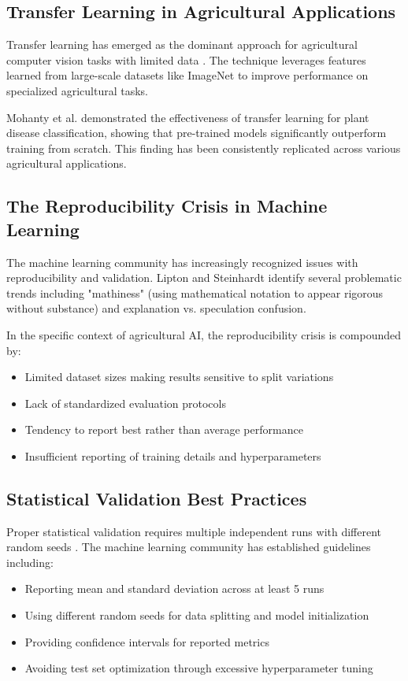 \documentclass[conference]{IEEEtran}
\begin{document}
\subsection{Transfer Learning in Agricultural Applications}

Transfer learning has emerged as the dominant approach for agricultural computer vision tasks with limited data \cite{kamilaris2018deep}. The technique leverages features learned from large-scale datasets like ImageNet to improve performance on specialized agricultural tasks.

Mohanty et al. \cite{mohanty2016using} demonstrated the effectiveness of transfer learning for plant disease classification, showing that pre-trained models significantly outperform training from scratch. This finding has been consistently replicated across various agricultural applications.

\subsection{The Reproducibility Crisis in Machine Learning}

The machine learning community has increasingly recognized issues with reproducibility and validation. Lipton and Steinhardt \cite{lipton2019troubling} identify several problematic trends including "mathiness" (using mathematical notation to appear rigorous without substance) and explanation vs. speculation confusion.

In the specific context of agricultural AI, the reproducibility crisis is compounded by:
\begin{itemize}
    \item Limited dataset sizes making results sensitive to split variations
    \item Lack of standardized evaluation protocols
    \item Tendency to report best rather than average performance
    \item Insufficient reporting of training details and hyperparameters
\end{itemize}

\subsection{Statistical Validation Best Practices}

Proper statistical validation requires multiple independent runs with different random seeds \cite{reimers2017reporting}. The machine learning community has established guidelines including:
\begin{itemize}
    \item Reporting mean and standard deviation across at least 5 runs
    \item Using different random seeds for data splitting and model initialization
    \item Providing confidence intervals for reported metrics
    \item Avoiding test set optimization through excessive hyperparameter tuning
\end{itemize}
\end{document}
